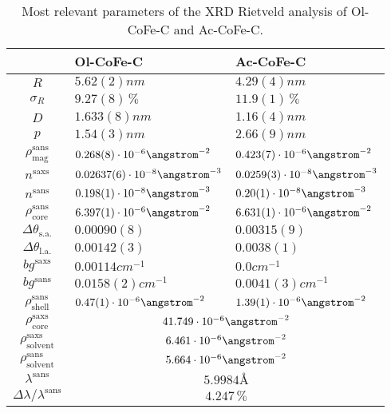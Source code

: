 \documentclass[\main/dresen_thesis.tex]{subfiles}
\begin{document}
    \begin{table}[h]
      \centering
      \caption{\label{tab:monolayers:nanoparticle:xrd}Most relevant parameters of the XRD Rietveld analysis of Ol-CoFe-C and Ac-CoFe-C.}
      \begin{tabular}{ c | l | l }
          & Ol-CoFe-C & Ac-CoFe-C \\
        \hline
        $R$
          & $5.62(2) \unit{nm}$
          & $4.29(4) \unit{nm}$\\
        $\sigma_R$
          & $9.27(8) \,\%$
          & $11.9(1) \,\%$\\
        $D$
          & $1.633(8) \unit{nm}$
          & $1.16(4) \unit{nm}$\\
        $p$
          & $1.54(3) \unit{nm}$
          & $2.66(9) \unit{nm}$\\
        $\rho_\mathrm{mag}^\mathrm{sans}$
          & $0.268(8) \cdot 10^{-6} \angstrom^{-2}$
          & $0.423(7) \cdot 10^{-6} \angstrom^{-2}$\\
        \hline
        $n^\mathrm{saxs}$
          & $0.02637(6) \cdot 10^{-8} \angstrom^{-3}$
          & $0.0259(3) \cdot 10^{-8} \angstrom^{-3}$\\
        $n^\mathrm{sans}$
          & $0.198(1) \cdot 10^{-8} \angstrom^{-3}$
          & $0.20(1) \cdot 10^{-8} \angstrom^{-3}$\\
        $\rho_\mathrm{core}^\mathrm{sans}$
          & $6.397(1) \cdot 10^{-6} \angstrom^{-2}$
          & $6.631(1) \cdot 10^{-6} \angstrom^{-2}$\\
        $\Delta \theta_\mathrm{s. a.}$
          & $0.00090(8)$
          & $0.00315(9)$\\
        $\Delta \theta_\mathrm{l. a.}$
          & $0.00142(3)$
          & $0.0038(1)$\\
        $bg^\mathrm{saxs}$
          & $0.00114 \unit{cm}^{-1}$
          & $0.0 \unit{cm}^{-1}$\\
        $bg^\mathrm{sans}$
          & $0.0158(2) \unit{cm}^{-1}$
          & $0.0041(3) \unit{cm}^{-1}$\\
        $\rho_\mathrm{shell}^\mathrm{sans}$
          & $0.47(1) \cdot 10^{-6} \angstrom^{-2}$
          & $1.39(1) \cdot 10^{-6} \angstrom^{-2}$\\
        \hline
        $\rho_\mathrm{core}^\mathrm{saxs}$
          & \multicolumn{2}{c}{$41.749 \cdot 10^{-6} \angstrom^{-2}$}\\
        $\rho_\mathrm{solvent}^\mathrm{saxs}$
          & \multicolumn{2}{c}{$6.461 \cdot 10^{-6} \angstrom^{-2}$}\\
        $\rho_\mathrm{solvent}^\mathrm{sans}$
          & \multicolumn{2}{c}{$5.664 \cdot 10^{-6} \angstrom^{-2}$}\\
        $\lambda^\mathrm{sans}$
          & \multicolumn{2}{c}{$5.9984 \unit{\angstrom}$}\\
        $\Delta \lambda / \lambda ^\mathrm{sans}$
          & \multicolumn{2}{c}{$4.247 \, \%$}\\
        \hline
      \end{tabular}
    \end{table}

\end{document}
